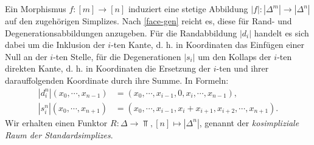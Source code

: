 Ein Morphismus $f: [m] \to [n]$ induziert eine stetige Abbildung $|f|:
|\Delta^m| \to |\Delta^n|$ auf den zugehörigen Simplizes. Nach
\ref{face-gen} reicht es, diese für Rand- und Degenerationsabbildungen
anzugeben. Für die Randabbildung $|d_i|$ handelt es sich dabei um die
Inklusion der $i$-ten Kante, d. h. in Koordinaten das Einfügen einer
Null an der $i$-ten Stelle, für die Degenerationen $|s_i|$ um den
Kollaps der $i$-ten direkten Kante, d. h. in Koordinaten die Ersetzung
der $i$-ten und ihrer darauffolgenden Koordinate durch ihre Summe. In
Formeln:
\begin{align*}
  |d_i^n|(x_0, \cdots, x_{n-1})
  &= (x_0, \cdots, x_{i-1}, 0, x_i, \cdots, x_{n-1}), \\
  |s_i^n|(x_0, \cdots, x_{n+1})
  &= (x_0, \cdots, x_{i-1}, x_i + x_{i+1}, x_{i+2}, \cdots, x_{n+1}).
\end{align*}
Wir erhalten einen Funktor $R: \Delta \to \Top, [n] \mapsto
|\Delta^n|$, genannt der \emph{kosimpliziale Raum der
  Standardsimplizes}.

